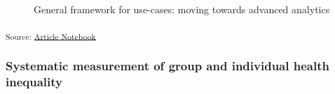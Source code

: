 \documentclass[
  letterpaper,
  DIV=11,
  numbers=noendperiod]{scrartcl}
\begin{document}
\begin{figure}


\caption{\label{fig-general-framework}General framework for use-cases:
moving towards advanced analytics}

\end{figure}%

\textsubscript{Source:
\href{https://d3london.github.io/sde_aic_docs/index.qmd.html}{Article
Notebook}}

\subsubsection{Systematic measurement of group and individual health
inequality}\label{systematic-measurement-of-group-and-individual-health-inequality}
\end{document}
